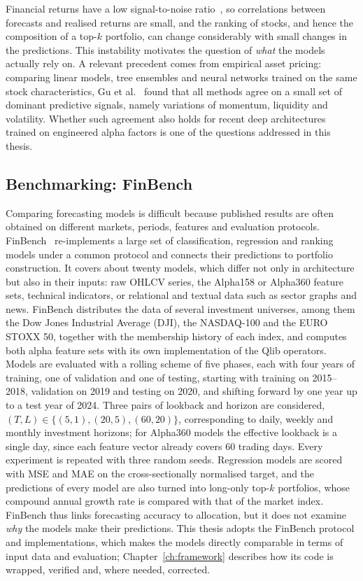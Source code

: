 Financial returns have a low signal-to-noise ratio~\cite{duan2022factorvae}, so correlations between forecasts and realised returns are small, and the ranking of stocks, and hence the composition of a top-$k$ portfolio, can change considerably with small changes in the predictions. This instability motivates the question of \emph{what} the models actually rely on. A relevant precedent comes from empirical asset pricing: comparing linear models, tree ensembles and neural networks trained on the same stock characteristics, Gu et al.~\cite{gu2020empirical} found that all methods agree on a small set of dominant predictive signals, namely variations of momentum, liquidity and volatility. Whether such agreement also holds for recent deep architectures trained on engineered alpha factors is one of the questions addressed in this thesis.

\subsection{Benchmarking: FinBench}

Comparing forecasting models is difficult because published results are often obtained on different markets, periods, features and evaluation protocols. FinBench~\cite{pederzoli2026finbench} re-implements a large set of classification, regression and ranking models under a common protocol and connects their predictions to portfolio construction. It covers about twenty models, which differ not only in architecture but also in their inputs: raw OHLCV series, the Alpha158 or Alpha360 feature sets, technical indicators, or relational and textual data such as sector graphs and news. FinBench distributes the data of several investment universes, among them the Dow Jones Industrial Average (DJI), the NASDAQ-100 and the EURO STOXX 50, together with the membership history of each index, and computes both alpha feature sets with its own implementation of the Qlib operators. Models are evaluated with a rolling scheme of five phases, each with four years of training, one of validation and one of testing, starting with training on 2015--2018, validation on 2019 and testing on 2020, and shifting forward by one year up to a test year of 2024. Three pairs of lookback and horizon are considered, $(T,L) \in \{(5,1), (20,5), (60,20)\}$, corresponding to daily, weekly and monthly investment horizons; for Alpha360 models the effective lookback is a single day, since each feature vector already covers 60 trading days. Every experiment is repeated with three random seeds. Regression models are scored with MSE and MAE on the cross-sectionally normalised target, and the predictions of every model are also turned into long-only top-$k$ portfolios, whose compound annual growth rate is compared with that of the market index. FinBench thus links forecasting accuracy to allocation, but it does not examine \emph{why} the models make their predictions. This thesis adopts the FinBench protocol and implementations, which makes the models directly comparable in terms of input data and evaluation; Chapter~\ref{ch:framework} describes how its code is wrapped, verified and, where needed, corrected.

